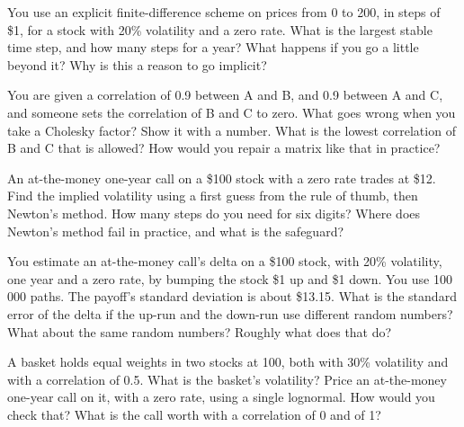 \begin{question}\label{iq:iv2:pricing-and-numerics:27}
You use an explicit finite-difference scheme on prices from 0 to 200, in steps of \$1, for a stock with 20\% volatility and a zero rate. What is the largest stable time step, and how many steps for a year? What happens if you go a little beyond it? Why is this a reason to go implicit?
\end{question}

\begin{question}\label{iq:iv2:pricing-and-numerics:28}
You are given a correlation of 0.9 between A and B, and 0.9 between A and C, and someone sets the correlation of B and C to zero. What goes wrong when you take a Cholesky factor? Show it with a number. What is the lowest correlation of B and C that is allowed? How would you repair a matrix like that in practice?
\end{question}

\begin{question}\label{iq:iv2:pricing-and-numerics:29}
An at-the-money one-year call on a \$100 stock with a zero rate trades at \$12. Find the implied volatility using a first guess from the rule of thumb, then Newton's method. How many steps do you need for six digits? Where does Newton's method fail in practice, and what is the safeguard?
\end{question}

\begin{question}\label{iq:iv2:pricing-and-numerics:30}
You estimate an at-the-money call's delta on a \$100 stock, with 20\% volatility, one year and a zero rate, by bumping the stock \$1 up and \$1 down. You use 100\,000 paths. The payoff's standard deviation is about \$13.15. What is the standard error of the delta if the up-run and the down-run use different random numbers? What about the same random numbers? Roughly what does that do?
\end{question}

\begin{question}\label{iq:iv2:pricing-and-numerics:31}
A basket holds equal weights in two stocks at 100, both with 30\% volatility and with a correlation of 0.5. What is the basket's volatility? Price an at-the-money one-year call on it, with a zero rate, using a single lognormal. How would you check that? What is the call worth with a correlation of 0 and of 1?
\end{question}

